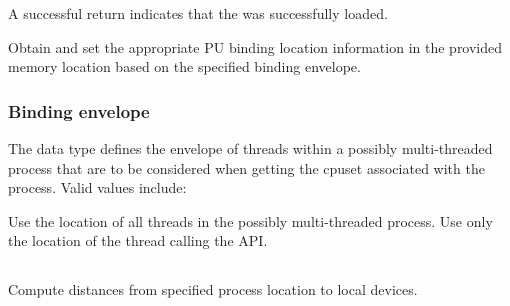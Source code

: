 A successful return indicates that the  was successfully loaded.

\returnsimple

\descr

Obtain and set the appropriate \ac{PU} binding location information in the provided memory location based on the specified binding envelope.

\subsubsection{Binding envelope}
\label{api:proc:bindenv}

The  data type
defines the envelope of threads within a possibly multi-threaded process that are to be considered when getting the cpuset associated with the process. Valid values include:

\begin{constantdesc}
%
Use the location of all threads in the possibly multi-threaded process.
%
Use only the location of the thread calling the \ac{API}.
%
\end{constantdesc}


\subsection{}

\summary

Compute distances from specified process location to local devices.

\format


